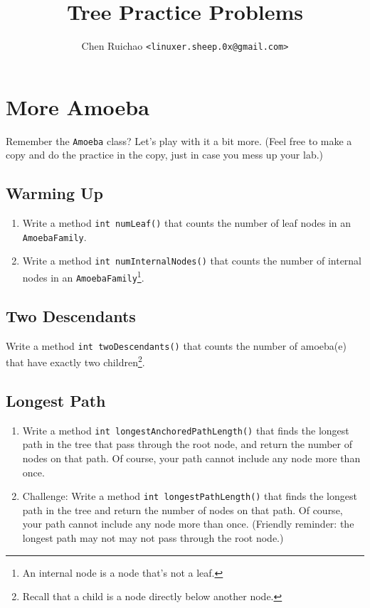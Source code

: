 \documentclass{article}
\begin{document}

\title{Tree Practice Problems}
\author{Chen Ruichao \texttt{<linuxer.sheep.0x@gmail.com>}}
\date{} %
\maketitle



\section{More Amoeba}
Remember the \verb|Amoeba| class?  Let's play with it a bit more.  (Feel free to make a copy and do the practice in the copy, just in case you mess up your lab.)

\subsection{Warming Up}
\begin{enumerate}
    \item Write a method \verb|int numLeaf()|          that counts the number of leaf     nodes in an \verb|AmoebaFamily|.
    \item Write a method \verb|int numInternalNodes()| that counts the number of internal nodes in an \verb|AmoebaFamily|\footnote{An internal node is a node that's not a leaf.}.
\end{enumerate}



\subsection{Two Descendants}
Write a method \verb|int twoDescendants()| that counts the number of amoeba(e) that have exactly two children\footnote{Recall that a child is a node directly below another node.}.

\subsection{Longest Path}

\begin{enumerate}
    \item Write a method \verb|int longestAnchoredPathLength()| that finds the longest path in the tree that pass through the root node, and return the number of nodes on that path.  Of course, your path cannot include any node more than once.
    \item Challenge: Write a method \verb|int longestPathLength()| that finds the longest path in the tree and return the number of nodes on that path.  Of course, your path cannot include any node more than once.  (Friendly reminder: the longest path may not may not pass through the root node.)
\end{enumerate}
\end{document}
